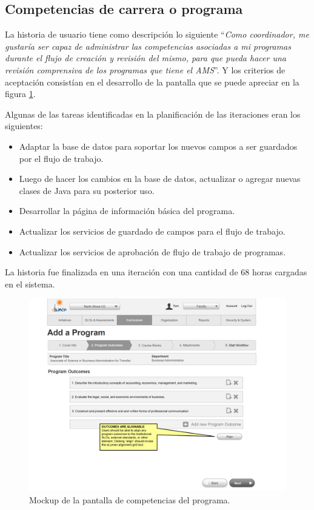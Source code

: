 \subsection{Competencias de carrera o programa}
La historia de usuario tiene como descripción lo siguiente \enquote{\textit{Como coordinador, me gustaría ser capaz de administrar las competencias asociadas a mi programas durante el flujo de creación y revisión del mismo, para que pueda hacer una revisión comprensiva de los programas que tiene el AMS}}. Y los criterios de aceptación consistían en el desarrollo de la pantalla que se puede apreciar en la figura \ref{program_learning_outcomes}.

Algunas de las tareas identificadas en la planificación de las iteraciones eran los siguientes:
\begin{itemize}
	\item Adaptar la base de datos para soportar los nuevos campos a ser guardados por el flujo de trabajo.
	\item Luego de hacer los cambios en la base de datos, actualizar o agregar nuevas clases de Java para su posterior uso.
	\item Desarrollar la página de información básica del programa.
	\item Actualizar los servicios de guardado de campos para el flujo de trabajo.
	\item Actualizar los servicios de aprobación de flujo de trabajo de programas.
\end{itemize}

La historia fue finalizada en una iteración con una cantidad de 68 horas cargadas en el sistema.

\begin{figure}[H]
\centering
\includegraphics[width=125mm,scale=1]{Capitulos/DesarrollodelaAplicacion/Imagenes/program_learning_outcomes}
\caption{Mockup de la pantalla de competencias del programa.}
  \label{program_learning_outcomes}
\end{figure}


